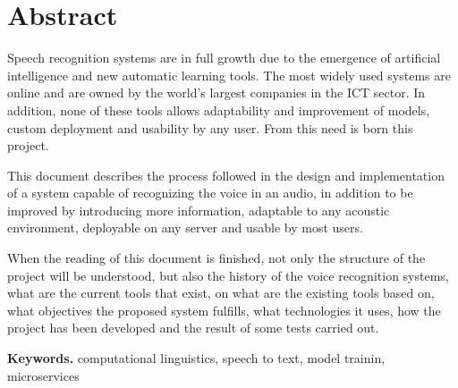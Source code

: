 \documentclass[../main.tex]{subfiles}
\begin{document}
\chapter*{Abstract}\label{ch:en_abstract}
\thispagestyle{empty}
Speech recognition systems are in full growth due to the emergence of artificial intelligence and new automatic learning tools. The most widely used systems are online and are owned by the world's largest companies in the ICT sector. In addition, none of these tools allows adaptability and improvement of models, custom deployment and usability by any user. From this need is born this project. 

This document describes the process followed in the design and implementation of a system capable of recognizing the voice in an audio, in addition to be improved by introducing more information, adaptable to any acoustic environment, deployable on any server and usable by most users. 

When the reading of this document is finished, not only the structure of the project will be understood, but also the history of the voice recognition systems, what are the current tools that exist, on what are the existing tools based on, what objectives the proposed system fulfills, what technologies it uses, how the project has been developed and the result of some tests carried out.

\smallskip
\noindent \textbf{Keywords.} computational linguistics, speech to text, model trainin, microservices
\end{document}
